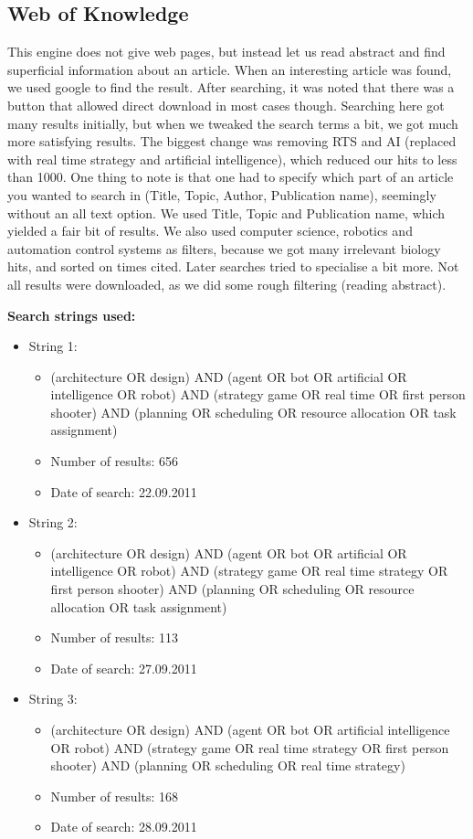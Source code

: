 \subsection{Web of Knowledge}
\label{sub:web_of_knowledge}
This engine does not give web pages, but instead let us read abstract and find superficial information about an article. When an interesting article was found, we used google to find the result. After searching, it was noted that there was a button that allowed direct download in most cases though. Searching here got many results initially, but when we tweaked the search terms a bit, we got much more satisfying results. The biggest change was removing RTS and AI (replaced with real time strategy and artificial intelligence), which reduced our hits to less than 1000. One thing to note is that one had to specify which part of an article you wanted to search in (Title, Topic, Author, Publication name), seemingly without an all text option. We used Title, Topic and Publication name, which yielded a fair bit of results. We also used computer science, robotics and automation control systems as filters, because we got many irrelevant biology hits, and sorted on times cited. Later searches tried to specialise a bit more. Not all results were downloaded, as we did some rough filtering (reading abstract).

\textbf{Search strings used:}
\begin{itemize}
\item String 1:
\begin{itemize}
\item (architecture OR design) AND (agent OR bot OR artificial OR intelligence OR robot) AND (strategy game OR real time OR first person shooter) AND (planning OR scheduling OR resource allocation OR task assignment)
\item Number of results: 656 
\item Date of search: 22.09.2011
\end{itemize}
\item String 2:
\begin{itemize}
\item (architecture OR design) AND (agent OR bot OR artificial OR intelligence OR robot) AND (strategy game OR real time strategy OR first person shooter) AND (planning OR scheduling OR resource allocation OR task assignment)
\item Number of results: 113
\item Date of search: 27.09.2011
\end{itemize}
\item String 3:
\begin{itemize}
\item (architecture OR design) AND (agent OR bot OR artificial intelligence OR robot) AND (strategy game OR real time strategy OR first person shooter) AND (planning OR scheduling OR real time strategy)
\item Number of results: 168
\item Date of search: 28.09.2011
\end{itemize}
\end{itemize}

